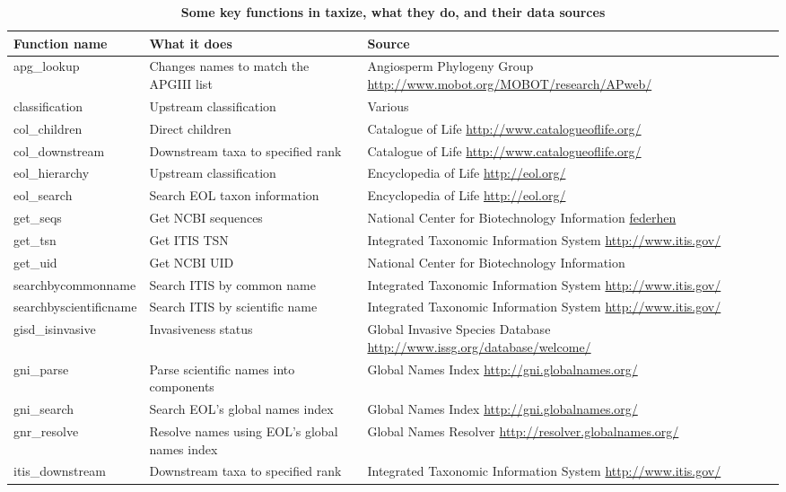 \documentclass[10pt,a4paper,twocolumn]{article}
\begin{document}
\begin{table}[!ht]
\centering
\caption{
\bf{Some key functions in taxize, what they do, and their data sources}}
\begin{tabular}{|l|L|L|}
\hline
Function name & What it does & Source \\
\hline
apg\_lookup & Changes names to match the APGIII list & Angiosperm Phylogeny Group \url{http://www.mobot.org/MOBOT/research/APweb/}  \\
classification & Upstream classification & Various  \\
col\_children & Direct children & Catalogue of Life \url{http://www.catalogueoflife.org/}  \\
col\_downstream & Downstream taxa to specified rank & Catalogue of Life \url{http://www.catalogueoflife.org/}  \\
eol\_hierarchy & Upstream classification & Encyclopedia of Life \url{http://eol.org/}  \\
eol\_search & Search EOL taxon information & Encyclopedia of Life \url{http://eol.org/}  \\
get\_seqs & Get NCBI sequences & National Center for Biotechnology Information \url{federhen}  \\
get\_tsn & Get ITIS TSN & Integrated Taxonomic Information System \url{http://www.itis.gov/}  \\
get\_uid & Get NCBI UID & National Center for Biotechnology Information \cite{federhen}  \\
searchbycommonname & Search ITIS by common name & Integrated Taxonomic Information System \url{http://www.itis.gov/}  \\
searchbyscientificname & Search ITIS by scientific name & Integrated Taxonomic Information System \url{http://www.itis.gov/}  \\
gisd\_isinvasive & Invasiveness status & Global Invasive Species Database \url{http://www.issg.org/database/welcome/}  \\
gni\_parse & Parse scientific names into components & Global Names Index \url{http://gni.globalnames.org/}   \\
gni\_search & Search EOL's global names index & Global Names Index \url{http://gni.globalnames.org/}   \\
gnr\_resolve & Resolve names using EOL's global names index & Global Names Resolver \url{http://resolver.globalnames.org/}  \\
itis\_downstream & Downstream taxa to specified rank & Integrated Taxonomic Information System \url{http://www.itis.gov/}  \\

\end{tabular}
\end{table}
\end{document}
